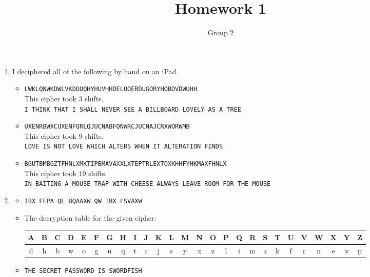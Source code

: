 \documentclass[12pt]{amsart}
\theoremstyle{definition}
\begin{document}
\title{Homework 1}
\author{Group 2}

\maketitle

\begin{enumerate}
	\item I deciphered all of the following by hand on an iPad.
		\begin{itemize}
			\item \texttt{LWKLQNWKDWLVKDOOQHYHUVHHDELOOERDUGORYHOBDVDWUHH} \\
                This cipher took 3 shifts. \\
                \texttt{I THINK THAT I SHALL NEVER SEE A BILLBOARD LOVELY AS A TREE}
			\item \texttt{UXENRBWXCUXENFQRLQJUCNABFQNWRCJUCNAJCRXWORWMB} \\
                This cipher took 9 shifts. \\
                \texttt{LOVE IS NOT LOVE WHICH ALTERS WHEN IT ALTERATION FINDS}
			\item \texttt{BGUTBMBGZTFHNLXMKTIPBMAVAXXLXTEPTRLEXTOXKHHFYHKMAXFHNLX}\\
                This cipher took 19 shifts. \\
                \texttt{IN BAITING A MOUSE TRAP WITH CHEESE ALWAYS LEAVE ROOM FOR THE MOUSE}
		\end{itemize}
  \item 
    	\begin{itemize}
      			\item \texttt{IBX FEPA QL BQAAXW QW IBX FSVAXW}
	 	\item The decryption table for the given cipher:
                \begin{center}
                \hspace*{-1cm}
    			\begin{tabular}{|c |c |c |c |c |c |c |c |c |c |c |c |c |c |c |c |c |c |c |c |c |c |c |c| c| c|}
    				\hline
    				A & B & C & D & E & F & G & H & I & J & K & L & M & N & O & 
    				P & Q & R & S & T & U & V & W & X & Y & Z \\
    				\hline
    				d & h & b & w & o & g & u & q & t & c & j & s & y & x & z & 
    				l & i & m & a & k & f & r & n & e & v & p \\
    				\hline 
    			\end{tabular} 
	        \end{center} 
            \medskip
            \item \texttt{THE SECRET PASSWORD IS SWORDFISH} 
	 	\end{itemize}
\end{enumerate}
\end{document}
